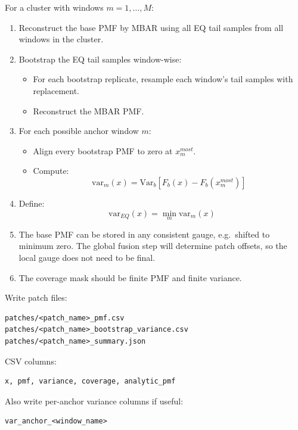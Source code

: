 \documentclass[
  10.5pt,
]{article}
\providecommand{\tightlist}{%
  \setlength{\itemsep}{0pt}\setlength{\parskip}{0pt}}
\begin{document}
For a cluster with windows \(m = 1,\dots,M\):

\begin{enumerate}
\def\labelenumi{\arabic{enumi}.}
\tightlist
\item
  Reconstruct the base PMF by MBAR using all EQ tail samples from all
  windows in the cluster.
\item
  Bootstrap the EQ tail samples window-wise:

  \begin{itemize}
  \tightlist
  \item
    For each bootstrap replicate, resample each window's tail samples
    with replacement.
  \item
    Reconstruct the MBAR PMF.
  \end{itemize}
\item
  For each possible anchor window \(m\):

  \begin{itemize}
  \tightlist
  \item
    Align every bootstrap PMF to zero at \(x^{most}_m\).
  \item
    Compute: \[
    \mathrm{var}_m(x) = \mathrm{Var}_b[F_b(x)-F_b(x^{most}_m)]
    \]
  \end{itemize}
\item
  Define: \[
  \mathrm{var}_{EQ}(x)=\min_m \mathrm{var}_m(x)
  \]
\item
  The base PMF can be stored in any consistent gauge, e.g.~shifted to
  minimum zero. The global fusion step will determine patch offsets, so
  the local gauge does not need to be final.
\item
  The coverage mask should be finite PMF and finite variance.
\end{enumerate}

Write patch files:

\begin{lstlisting}
patches/<patch_name>_pmf.csv
patches/<patch_name>_bootstrap_variance.csv
patches/<patch_name>_summary.json
\end{lstlisting}

CSV columns:

\begin{lstlisting}
x, pmf, variance, coverage, analytic_pmf
\end{lstlisting}

Also write per-anchor variance columns if useful:

\begin{lstlisting}
var_anchor_<window_name>
\end{lstlisting}
\end{document}

